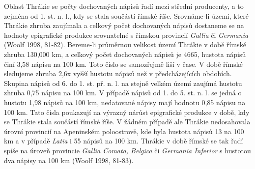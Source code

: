 Oblast Thrákie se počty dochovaných nápisů řadí mezi střední producenty, a to zejména od 1. st. n. l., kdy se stala součástí římské říše. Srovnáme-li území, které Thrákie zhruba zaujímala a celkový počet dochovaných nápisů dostaneme se na hodnoty epigrafické produkce srovnatelné s římskou provincií {\em Gallia} či {\em Germania} (Woolf 1998, 81-82). Bereme-li průměrnou velikost území Thrákie v době římské zhruba 130,000 km, a celkový počet dochovaných nápisů je 4665, hustota nápisů činí 3,58 nápisu na 100 km. Toto číslo se samozřejmě liší v čase. V době římské sledujeme zhruba 2,6x vyšší hustotu nápisů než v předcházejících obdobích. Skupina nápisů od 6. do 1. st. př. n. l. na stejně velkém území zaujímá hustotu zhruba 0,75 nápisu na 100 km. V případě nápisů od 1. do 5. st. n. l. se jedná o hustotu 1,98 nápisů na 100 km, nedatované nápisy mají hodnotu 0,85 nápisu na 100 km. Tato čísla poukazují na výrazný nárůst epigrafické produkce v době, kdy se Thrákie stala součástí římské říše. V žádném případě ale Thrákie nedosahovala úrovní provincií na Apeninském poloostrově, kde byla hustota nápisů 13 na 100 km a v případě {\em Latia} i 55 nápisů na 100 km. Thrákie v době římské se tak řadí spíše na úroveň provincie {\em Gallia Comata, Belgica} či {\em Germania Inferior} s hustotou dva nápisy na 100 km (Woolf 1998, 81-83).

